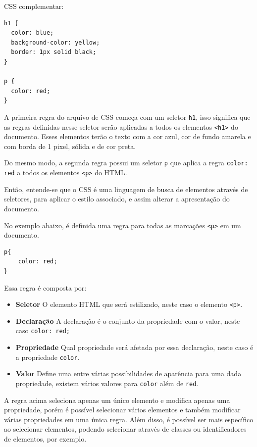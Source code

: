 CSS complementar:

\begin{verbatim}
h1 {
  color: blue;
  background-color: yellow;
  border: 1px solid black;
}

p {
  color: red;
}
\end{verbatim}

A primeira regra do arquivo de CSS começa com um seletor \texttt{h1},
isso significa que as regras definidas nesse seletor serão aplicadas a
todos os elementos \texttt{\textless{}h1\textgreater{}} do documento. Esses
elementos terão o texto com a cor azul, cor de fundo amarela e com borda
de 1 pixel, sólida e de cor preta.

Do mesmo modo, a segunda regra possui um seletor \texttt{p} que aplica a regra \texttt{color: red} a
todos os elementos \texttt{\textless{}p\textgreater{}} do HTML.

Então, entende-se que o CSS é uma linguagem de busca de 
elementos através de seletores, para
aplicar o estilo associado, e assim alterar a
apresentação do documento.

No exemplo abaixo, é definida uma regra para todas as marcações
\texttt{\textless{}p\textgreater{}} em um documento.

\begin{verbatim}
p{
    color: red;
}
\end{verbatim}

Essa regra é composta por:

\begin{itemize}
\tightlist
\item
  \textbf{Seletor} O elemento HTML que será estilizado, neste caso o
  elemento \texttt{\textless{}p\textgreater{}}.
\item
  \textbf{Declaração} A declaração é o conjunto da propriedade com o
  valor, neste caso \texttt{color:\ red;}
\item
  \textbf{Propriedade} Qual propriedade será afetada por essa
  declaração, neste caso é a propriedade \texttt{color}.
\item
  \textbf{Valor} Define uma entre várias possibilidades de aparência
  para uma dada propriedade, existem vários valores para \texttt{color}
  além de \texttt{red}.
\end{itemize}

A regra acima seleciona apenas um único elemento e modifica apenas uma
propriedade, porém é possível selecionar vários elementos e também
modificar várias propriedades em uma única regra. Além disso, é possível
ser mais específico ao selecionar elementos, podendo selecionar através
de classes ou identificadores de elementos, por exemplo.

